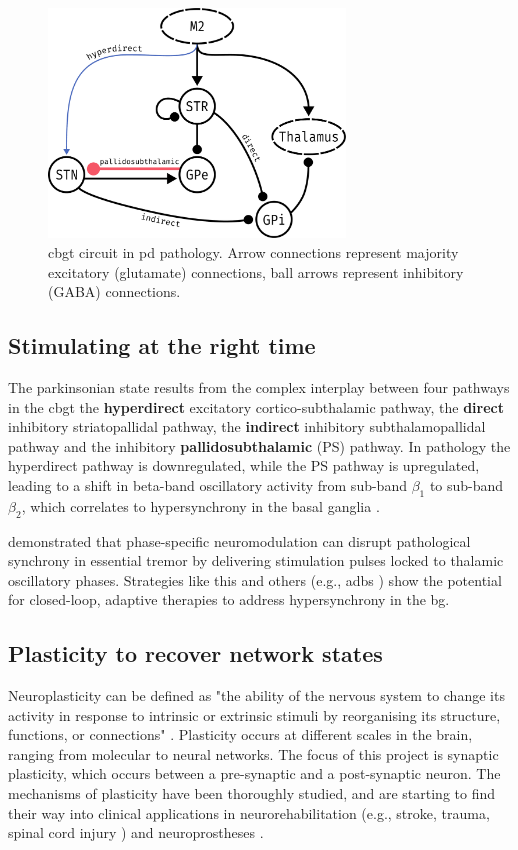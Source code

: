 \begin{figure}[ht]
	\centering
	\includegraphics[height=2.4in]{figs/cbgt_circuit.pdf}
	\caption{\acrshort{cbgt} circuit in \acrshort{pd} pathology. Arrow connections represent majority excitatory (glutamate) connections,
		ball arrows represent inhibitory (GABA) connections.}
\end{figure}

\subsection{Stimulating at the right time}
The parkinsonian state results from the complex interplay between four pathways in the \acrshort{cbgt}
the \textbf{hyperdirect} excitatory cortico-subthalamic pathway,
the \textbf{direct} inhibitory striatopallidal pathway,
the \textbf{indirect} inhibitory subthalamopallidal pathway and
the inhibitory \textbf{pallidosubthalamic} (PS) pathway. In pathology the hyperdirect
pathway is downregulated, while the PS pathway is upregulated, leading to a shift in
beta-band oscillatory activity from sub-band $\beta_1$ to sub-band $\beta_2$, which correlates to
hypersynchrony in the basal ganglia \cite{west2022stimulating}.

\cite{cagnan2017stimulating} demonstrated that phase-specific neuromodulation can disrupt pathological
synchrony in essential tremor by delivering stimulation pulses locked to thalamic oscillatory phases.
Strategies like this and others (e.g., \acrshort{adbs} \cite{beudel2018adaptive}) show the potential for closed-loop,
adaptive therapies to address hypersynchrony in the \acrshort{bg}.

\subsection{Plasticity to recover network states}
Neuroplasticity can be defined as "the ability of the nervous system to change its activity in
response to intrinsic or extrinsic stimuli by reorganising its structure, functions, or
connections" \cite{mateos2019impact}.
Plasticity occurs at different scales in the brain, ranging from molecular to neural networks.
The focus of this project is synaptic plasticity, which occurs between a pre-synaptic and a
post-synaptic neuron. The mechanisms of plasticity have been thoroughly studied, and
are starting to find their way into clinical applications in neurorehabilitation (e.g., stroke, trauma,
spinal cord injury \cite{cramer2011harnessing}) and neuroprostheses \cite{lebedev2017brain}.

